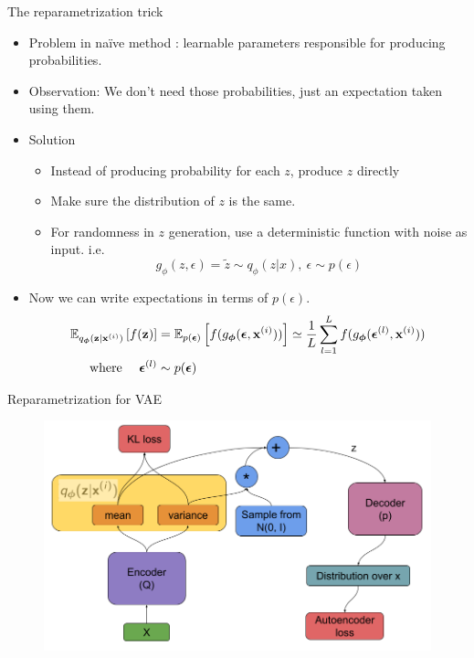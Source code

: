 \documentclass{beamer}
\begin{document}
\begin{frame}{The reparametrization trick}
    \begin{itemize}
        \item{
            Problem in na{\"i}ve method : learnable parameters responsible for producing probabilities.
        }
        \item{
            Observation: We don't need those probabilities, just an expectation taken using them.
        }
        \item{
            Solution
            \begin{itemize}
                \item {
                    Instead of producing probability for each $z$, produce $z$ directly
                }
                \item {
                    Make sure the distribution of $z$ is the same.
                }
                \item{
                    For randomness in $z$ generation, use a deterministic function with noise as input. i.e.
                    $$g_{\phi}(z, \epsilon) = \widetilde{z} \sim q_{\phi}(z|x), \ \epsilon \sim p(\epsilon)$$
                }
            \end{itemize}
        }
        \item {
            Now we can write expectations in terms of $p(\epsilon)$.
            \begin{align*}
                \mathbb{E}_{q_{\boldsymbol{\phi}}(\mathbf{z}|\mathbf{x}^{(i)})}\left[f(\mathbf{z})\right]
                &= \mathbb{E}_{p(\boldsymbol{\epsilon})}\left[f(g_{\boldsymbol{\phi}}(\boldsymbol{\epsilon},\mathbf{x}^{(i)}))\right] \simeq \frac{1}{L} \sum_{l=1}^L{f(g_{\boldsymbol{\phi}}(\boldsymbol{\epsilon}^{(l)},\mathbf{x}^{(i)}))} \\
                \text{\quad where \quad} \boldsymbol{\epsilon}^{(l)} &\sim p(\boldsymbol{\epsilon})
            \end{align*}
        }
    \end{itemize}
\end{frame}

\begin{frame}{Reparametrization for VAE}
    \begin{figure}
        \centering
        \includegraphics[width=\textwidth]{vae_param}
    \end{figure}
\end{frame}
\end{document}
